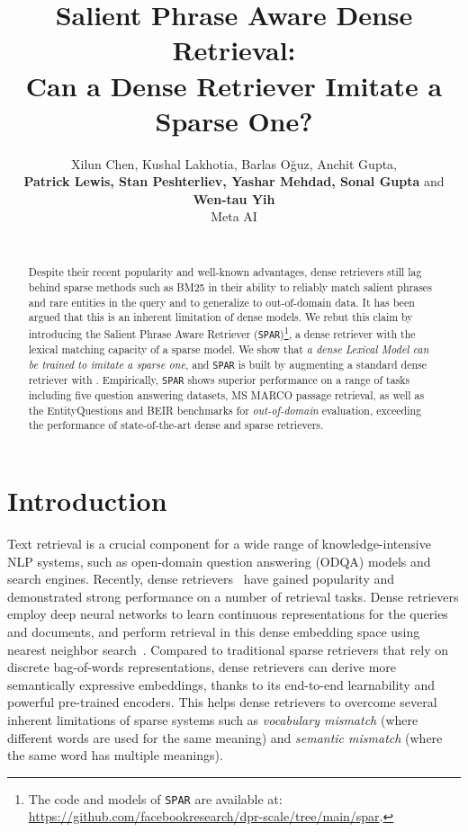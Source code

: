\documentclass[11pt]{article}
\title{Salient Phrase Aware Dense Retrieval:\\Can a Dense Retriever Imitate a Sparse One?}
\author{
Xilun Chen, Kushal Lakhotia\textsuperscript{\textdagger}, Barlas Oğuz, Anchit Gupta,\\
\textbf{Patrick Lewis, Stan Peshterliev, Yashar Mehdad, Sonal Gupta} and \textbf{Wen-tau Yih}\\
Meta AI\\
\scalebox{0.88}{\texttt{\{xilun,barlaso,anchit,plewis,stanvp,mehdad,sonalgupta,scottyih\}@meta.com}}\\
\scalebox{0.88}{\textsuperscript{\textdagger}\texttt{lakhotia.kushal@gmail.com}}
}
\newcommand{\spar}{\texttt{SPAR}\xspace}
\newcommand{\lexmodel}{Lexical Model}
\newcommand{\lexmodelsymbol}{\xspace}
\begin{document}
\maketitle
\begin{abstract}

Despite their recent popularity and well-known advantages, dense retrievers still lag behind sparse methods such as BM25 in their ability to reliably match salient phrases and rare entities in the query and to generalize to out-of-domain data. 
It has been argued that this is an inherent limitation of dense models. 
We rebut this claim by introducing the Salient Phrase Aware Retriever (\spar{})\footnote{The code and models of \spar{} are available at: 
\url{https://github.com/facebookresearch/dpr-scale/tree/main/spar}.}, 
a dense retriever with the lexical matching capacity of a sparse model. 
We show that \emph{a dense \lexmodel{} \lexmodelsymbol{} can be trained to imitate a sparse one}, and \spar{} is built by augmenting a standard dense retriever with \lexmodelsymbol{}.
Empirically, \spar shows superior performance on a range of tasks including five question answering datasets, MS MARCO passage retrieval, as well as the EntityQuestions and BEIR benchmarks for \emph{out-of-domain} evaluation, exceeding the performance of state-of-the-art dense and sparse retrievers.

 
\end{abstract}




\section{Introduction}\label{sec:intro}
Text retrieval is a crucial component for a wide range of knowledge-intensive NLP systems, such as open-domain question answering (ODQA) models and search engines.
Recently, dense retrievers~\cite{karpukhin-etal-2020-dense,xiong2021approximate} have gained popularity and demonstrated strong performance on a number of retrieval tasks.
Dense retrievers employ deep neural networks to learn continuous representations for the queries and documents, and perform retrieval in this dense embedding space using nearest neighbor search~\cite{faiss}.
Compared to traditional sparse retrievers that rely on discrete bag-of-words representations, dense retrievers can derive more semantically expressive embeddings, thanks to its end-to-end learnability and powerful pre-trained encoders.
This helps dense retrievers to overcome several inherent limitations of sparse systems such as \emph{vocabulary mismatch} (where different words are used for the same meaning) and \emph{semantic mismatch} (where the same word has multiple meanings).
\end{document}
